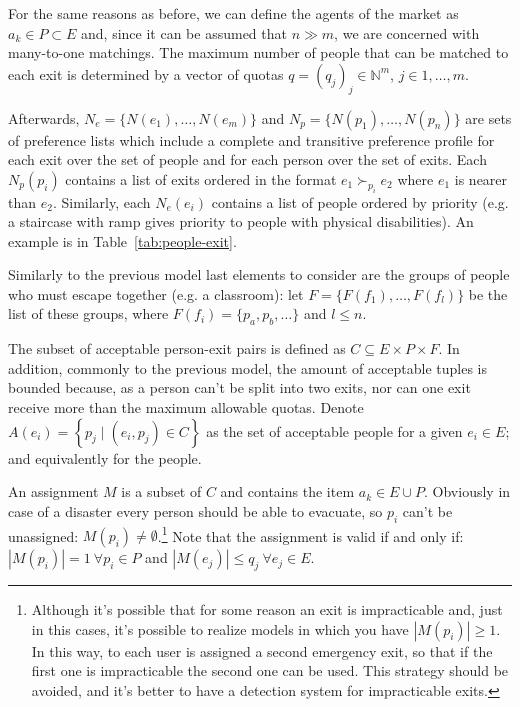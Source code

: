 For the same reasons as before, we can define the agents of the market as \(a_k \in P \subset E\) and, since it can be assumed that \(n \gg m\), we are concerned with many-to-one matchings. The maximum number of people that can be matched to each exit is determined by a vector of quotas \(q = (q_j)_j \in \mathbb{N}^m\), \(j\in {1,\ldots,m}\).

Afterwards, \(N_e = \{N(e_1), \dots, N(e_m)\}\) and \(N_p = \{ N(p_1), \dots, N(p_n)\}\) are sets of preference lists which include a complete and transitive preference profile for each exit over the set of people and for each person over the set of exits. Each \(N_p(p_i)\) contains a list of exits ordered in the format \(e_1 \succ_{p_i} e_2\) where \(e_1\) is nearer than \(e_2\). Similarly, each \(N_e(e_i)\) contains a list of people ordered by priority (e.g. a staircase with ramp gives priority to people with physical disabilities). An example is in Table~\ref{tab:people-exit}.

Similarly to the previous model last elements to consider are the groups of people who must escape together (e.g. a classroom): let \(F=\{F(f_1), \dots, F(f_l)\}\) be the list of these groups, where \(F(f_i) = \{p_a, p_b, \dots\}\) and \(l\leq n\).

The subset of acceptable person-exit pairs is defined as \(C \subseteq E \times P \times F\). In addition, commonly to the previous model, the amount of acceptable tuples is bounded because, as a person can't be split into two exits, nor can one exit receive more than the maximum allowable quotas. Denote \( A \left( e_i \right) = \left\{ p_j \mid \left( e_i , p_j \right) \in C \right\} \) as the set of acceptable people for a given \( e_i \in E \); and equivalently for the people.

An assignment \(M\) is a subset of \(C\) and contains the item \( a_k \in E \cup P \). Obviously in case of a disaster every person should be able to evacuate, so  \( p_i\) can't be unassigned: \( M \left( p_i\right) \neq \emptyset \).\footnote{Although it's possible that for some reason an exit is impracticable and, just in this cases, it's possible to realize models in which you have \(|M \left( p_i \right)| \geq 1\). In this way, to each user is assigned a second emergency exit, so that if the first one is impracticable the second one can be used. This strategy should be avoided, and it's better to have a detection system for impracticable exits.}
Note that the assignment is valid if and only if: \(\left| M \left( p_i\right) \right| = 1 \ \forall p_i\in P\) and \(\left| M \left( e_j \right) \right| \leq q_j \ \forall e_j \in E\).

